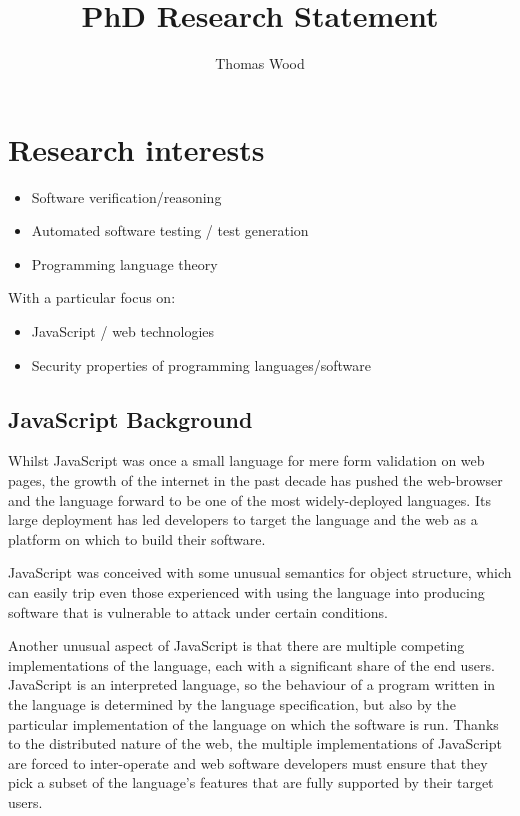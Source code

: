 \documentclass[a4paper]{article}
\title{PhD Research Statement}
\author{Thomas Wood}
\begin{document}
\maketitle

\section{Research interests}
\begin{itemize}
\item Software verification/reasoning
\item Automated software testing / test generation
\item Programming language theory
\end{itemize}
With a particular focus on:
\begin{itemize}
\item JavaScript / web technologies
\item Security properties of programming languages/software
\end{itemize}

\subsection{JavaScript Background}
Whilst JavaScript was once a small language for mere form validation on web
pages, the growth of the internet in the past decade has pushed the web-browser
and the language forward to be one of the most widely-deployed languages.
Its large deployment has led developers to target the language and the web as a
platform on which to build their software. %

JavaScript was conceived with some unusual semantics for object structure, which
can easily trip even those experienced with
using the language into producing software that is vulnerable to attack under
certain conditions.

Another unusual aspect of JavaScript is that there are multiple competing
implementations of the language, each with a significant share of the end users.
JavaScript is an interpreted language, so the behaviour of a program written in
the language is determined by the language specification, but also by
the particular implementation of the language on which the software is
run. Thanks to the distributed nature of the web, the multiple implementations
of JavaScript are forced to inter-operate and web software developers must
ensure that they pick a subset of the language's features that are fully
supported by their target users.
\end{document}
